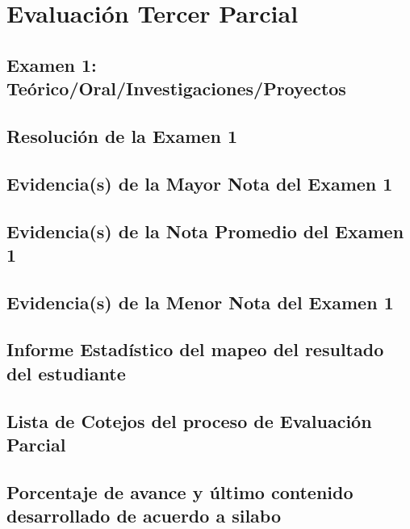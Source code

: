 

\chapter{Evaluación Tercer Parcial}
\newpage
% 

\section{Examen 1: Teórico/Oral/Investigaciones/Proyectos}
\section{Resolución de la Examen 1}
\section{Evidencia(s) de la Mayor Nota del Examen 1}
\section{Evidencia(s) de la Nota Promedio del Examen 1}
\section{Evidencia(s) de la Menor Nota del Examen 1}
\section{Informe Estadístico del mapeo del resultado del estudiante}
\section{Lista de Cotejos del proceso de Evaluación Parcial}
\section{Porcentaje de avance y último contenido desarrollado de acuerdo a silabo}


\pagestyle{empty} %




